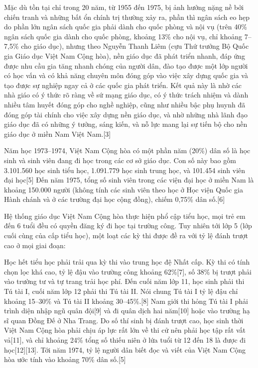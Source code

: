 \documentclass[../thesis.tex]{subfiles}
\begin{document}
Mặc dù tồn tại chỉ trong 20 năm, từ 1955 đến 1975, bị ảnh hưởng nặng nề bởi chiến tranh và những bất ổn chính trị thường xảy ra, phần thì ngân sách eo hẹp do phần lớn ngân sách quốc gia phải dành cho quốc phòng và nội vụ (trên 40\% ngân sách quốc gia dành cho quốc phòng, khoảng 13\% cho nội vụ, chỉ khoảng 7–7,5\% cho giáo dục), nhưng theo Nguyễn Thanh Liêm (cựu Thứ trưởng Bộ Quốc gia Giáo dục Việt Nam Cộng hòa), nền giáo dục đã phát triển nhanh, đáp ứng được nhu cầu gia tăng nhanh chóng của người dân, đào tạo được một lớp người có học vấn và có khả năng chuyên môn đóng góp vào việc xây dựng quốc gia và tạo được sự nghiệp ngay cả ở các quốc gia phát triển. Kết quả này là nhờ các nhà giáo có ý thức rõ ràng về sứ mạng giáo dục, có ý thức trách nhiệm và dành nhiều tâm huyết đóng góp cho nghề nghiệp, cũng như nhiều bậc phụ huynh đã đóng góp tài chính cho việc xây dựng nền giáo dục, và nhờ những nhà lãnh đạo giáo dục đã có những ý tưởng, sáng kiến, và nỗ lực mang lại sự tiến bộ cho nền giáo dục ở miền Nam Việt Nam.[3]

Năm học 1973–1974, Việt Nam Cộng hòa có một phần năm (20\%) dân số là học sinh và sinh viên đang đi học trong các cơ sở giáo dục. Con số này bao gồm 3.101.560 học sinh tiểu học, 1.091.779 học sinh trung học, và 101.454 sinh viên đại học[5] Đến năm 1975, tổng số sinh viên trong các viện đại học ở miền Nam là khoảng 150.000 người (không tính các sinh viên theo học ở Học viện Quốc gia Hành chánh và ở các trường đại học cộng đồng), chiếm 0,75\% dân số.[6]

Hệ thống giáo dục Việt Nam Cộng hòa thực hiện phổ cập tiểu học, mọi trẻ em đến 6 tuổi đều có quyền đăng ký đi học tại trường công. Tuy nhiên tới lớp 5 (lớp cuối cùng của cấp tiểu học), một loạt các kỳ thi được đề ra với tỷ lệ đánh trượt cao ở mọi giai đoạn:

Học hết tiểu học phải trải qua kỳ thi vào trung học đệ Nhất cấp. Kỳ thi có tính chọn lọc khá cao, tỷ lệ đậu vào trường công khoảng 62\%[7], số 38\% bị trượt phải vào trường tư và tự trang trải học phí.
Đến cuối năm lớp 11, học sinh phải thi Tú tài I, cuối năm lớp 12 phải thi Tú tài II. Nói chung Tú tài I tỷ lệ đậu chỉ khoảng 15–30\% và Tú tài II khoảng 30–45\%.[8] Nam giới thi hỏng Tú tài I phải trình diện nhập ngũ quân đội[9] và đi quân dịch hai năm[10] hoặc vào trường hạ sĩ quan Đồng Đế ở Nha Trang.
Do số thí sinh bị đánh trượt cao, học sinh thời Việt Nam Cộng hòa phải chịu áp lực rất lớn về thi cử nên phải học tập rất vất vả[11], và chỉ khoảng 24\% tổng số thiếu niên ở lứa tuổi từ 12 đến 18 là được đi học[12][13].
Tới năm 1974, tỷ lệ người dân biết đọc và viết của Việt Nam Cộng hòa ước tính vào khoảng 70\% dân số.[5]
\end{document}
